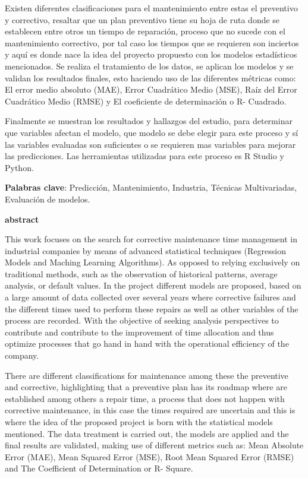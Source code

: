 \documentclass[
  11pt,
  bookmarksnumbered]{article}
\begin{document}
Existen diferentes clasificaciones para el mantenimiento entre estas el preventivo y correctivo, resaltar que un plan preventivo tiene su hoja de ruta donde se establecen entre otros un tiempo de reparación, proceso que no sucede con el mantenimiento correctivo, por tal caso los tiempos que se requieren son inciertos y aquí es donde nace la idea del proyecto propuesto con los modelos estadísticos mencionados. Se realiza el tratamiento de los datos, se aplican los modelos y se validan los resultados finales, esto haciendo uso de las diferentes métricas como: El error medio absoluto (MAE), Error Cuadrático Medio (MSE), Raíz del Error Cuadrático Medio (RMSE) y El coeficiente de determinación o R- Cuadrado.

Finalmente se muestran los resultados y hallazgos del estudio, para determinar que variables afectan el modelo, que modelo se debe elegir para este proceso y sí las variables evaluadas son suficientes o se requieren mas variables para mejorar las predicciones. Las herramientas utilizadas para este proceso es R Studio y Python.

\textbf{Palabras clave}: Predicción, Mantenimiento, Industria, Técnicas Multivariadas, Evaluación de modelos.

\newpage

\begin{center}
\textbf{abstract}
\end{center}

This work focuses on the search for corrective maintenance time management in industrial companies by means of advanced statistical techniques (Regression Models and Maching Learning Algorithms). As opposed to relying exclusively on traditional methods, such as the observation of historical patterns, average analysis, or default values. In the project different models are proposed, based on a large amount of data collected over several years where corrective failures and the different times used to perform these repairs as well as other variables of the process are recorded. With the objective of seeking analysis perspectives to contribute and contribute to the improvement of time allocation and thus optimize processes that go hand in hand with the operational efficiency of the company.

There are different classifications for maintenance among these the preventive and corrective, highlighting that a preventive plan has its roadmap where are established among others a repair time, a process that does not happen with corrective maintenance, in this case the times required are uncertain and this is where the idea of the proposed project is born with the statistical models mentioned. The data treatment is carried out, the models are applied and the final results are validated, making use of different metrics such as: Mean Absolute Error (MAE), Mean Squared Error (MSE), Root Mean Squared Error (RMSE) and The Coefficient of Determination or R- Square.
\end{document}
